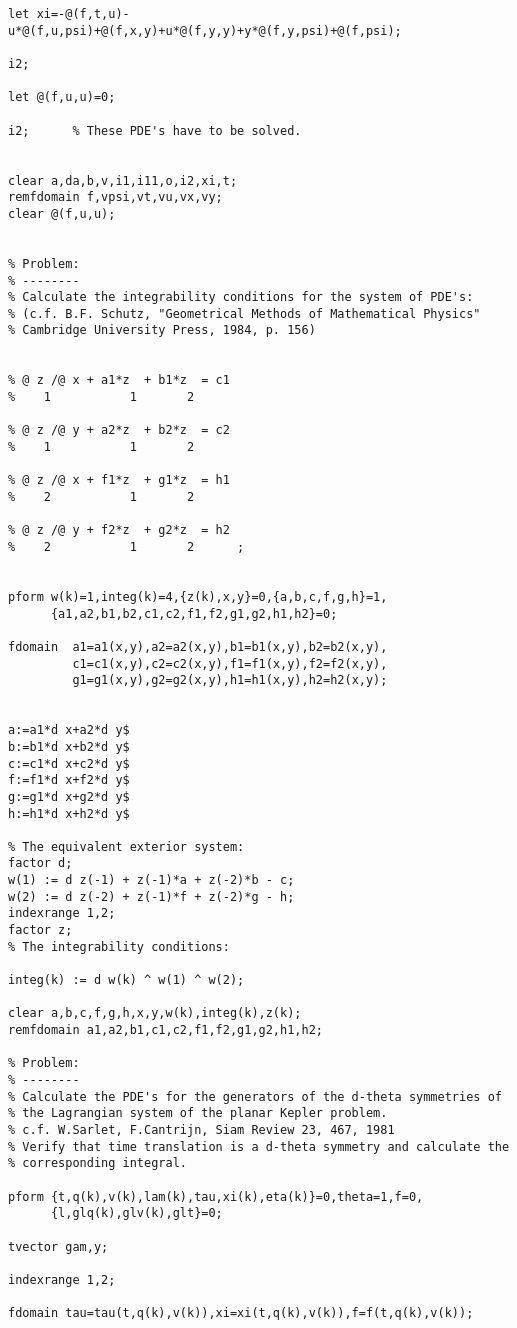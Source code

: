 {\begin{verbatim}
let xi=-@(f,t,u)-u*@(f,u,psi)+@(f,x,y)+u*@(f,y,y)+y*@(f,y,psi)+@(f,psi);

i2;

let @(f,u,u)=0;

i2;      % These PDE's have to be solved.


clear a,da,b,v,i1,i11,o,i2,xi,t;
remfdomain f,vpsi,vt,vu,vx,vy;
clear @(f,u,u);


% Problem:
% --------
% Calculate the integrability conditions for the system of PDE's:
% (c.f. B.F. Schutz, "Geometrical Methods of Mathematical Physics"
% Cambridge University Press, 1984, p. 156)


% @ z /@ x + a1*z  + b1*z  = c1
%    1           1       2

% @ z /@ y + a2*z  + b2*z  = c2
%    1           1       2

% @ z /@ x + f1*z  + g1*z  = h1
%    2           1       2

% @ z /@ y + f2*z  + g2*z  = h2
%    2           1       2      ;


pform w(k)=1,integ(k)=4,{z(k),x,y}=0,{a,b,c,f,g,h}=1,
      {a1,a2,b1,b2,c1,c2,f1,f2,g1,g2,h1,h2}=0;

fdomain  a1=a1(x,y),a2=a2(x,y),b1=b1(x,y),b2=b2(x,y),
         c1=c1(x,y),c2=c2(x,y),f1=f1(x,y),f2=f2(x,y),
         g1=g1(x,y),g2=g2(x,y),h1=h1(x,y),h2=h2(x,y);


a:=a1*d x+a2*d y$
b:=b1*d x+b2*d y$
c:=c1*d x+c2*d y$
f:=f1*d x+f2*d y$
g:=g1*d x+g2*d y$
h:=h1*d x+h2*d y$

% The equivalent exterior system:
factor d;
w(1) := d z(-1) + z(-1)*a + z(-2)*b - c;
w(2) := d z(-2) + z(-1)*f + z(-2)*g - h;
indexrange 1,2;
factor z;
% The integrability conditions:

integ(k) := d w(k) ^ w(1) ^ w(2);

clear a,b,c,f,g,h,x,y,w(k),integ(k),z(k);
remfdomain a1,a2,b1,c1,c2,f1,f2,g1,g2,h1,h2;

% Problem:
% --------
% Calculate the PDE's for the generators of the d-theta symmetries of
% the Lagrangian system of the planar Kepler problem.
% c.f. W.Sarlet, F.Cantrijn, Siam Review 23, 467, 1981
% Verify that time translation is a d-theta symmetry and calculate the
% corresponding integral.

pform {t,q(k),v(k),lam(k),tau,xi(k),eta(k)}=0,theta=1,f=0,
      {l,glq(k),glv(k),glt}=0;

tvector gam,y;

indexrange 1,2;

fdomain tau=tau(t,q(k),v(k)),xi=xi(t,q(k),v(k)),f=f(t,q(k),v(k));


\end{verbatim}}
